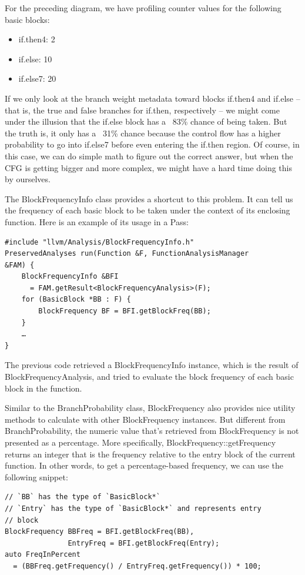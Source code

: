 For the preceding diagram, we have profiling counter values for the following basic blocks:

\begin{itemize}
\item if.then4: 2
\item if.else: 10
\item if.else7: 20
\end{itemize}

If we only look at the branch weight metadata toward blocks if.then4 and if.else – that is, the true and false branches for if.then, respectively – we might come under the illusion that the if.else block has a ~83\% chance of being taken. But the truth is, it only has a ~31\% chance because the control flow has a higher probability to go into if.else7 before even entering the if.then region. Of course, in this case, we can do simple math to figure out the correct answer, but when the CFG is getting bigger and more complex, we might have a hard time doing this by ourselves.

The BlockFrequencyInfo class provides a shortcut to this problem. It can tell us the frequency of each basic block to be taken under the context of its enclosing function. Here is an example of its usage in a Pass:

\begin{lstlisting}[style=styleCXX]
#include "llvm/Analysis/BlockFrequencyInfo.h"
PreservedAnalyses run(Function &F, FunctionAnalysisManager
&FAM) {
	BlockFrequencyInfo &BFI
	  = FAM.getResult<BlockFrequencyAnalysis>(F);
	for (BasicBlock *BB : F) {
		BlockFrequency BF = BFI.getBlockFreq(BB);
	}
	…
}
\end{lstlisting}

The previous code retrieved a BlockFrequencyInfo instance, which is the result of BlockFrequencyAnalysis, and tried to evaluate the block frequency of each basic block in the function.

Similar to the BranchProbability class, BlockFrequency also provides nice utility methods to calculate with other BlockFrequency instances. But different from BranchProbability, the numeric value that's retrieved from BlockFrequency is not presented as a percentage. More specifically, BlockFrequency::getFrequency returns an integer that is the frequency relative to the entry block of the current function. In other words, to get a percentage-based frequency, we can use the following snippet:

\begin{lstlisting}[style=styleCXX]
// `BB` has the type of `BasicBlock*`
// `Entry` has the type of `BasicBlock*` and represents entry
// block
BlockFrequency BBFreq = BFI.getBlockFreq(BB),
               EntryFreq = BFI.getBlockFreq(Entry);
auto FreqInPercent
  = (BBFreq.getFrequency() / EntryFreq.getFrequency()) * 100;
\end{lstlisting}

